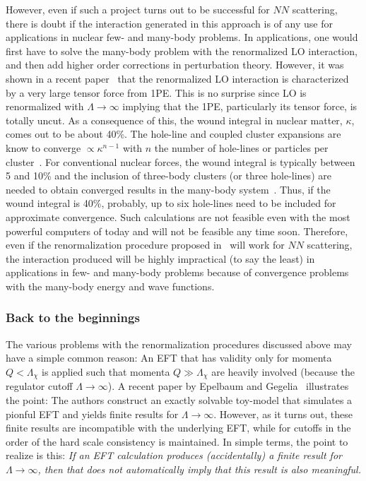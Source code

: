 \documentclass[sort&compress,preprint,3p]{elsarticle}
\begin{document}
However, even if such a project turns out to be successful for $NN$ scattering,
there is doubt if the interaction generated in this approach is of any use
for applications in nuclear few- and many-body problems.
In applications, one would first have to solve the many-body problem
with the renormalized LO interaction, and then add higher order corrections in
perturbation theory.
However, it was shown in a recent paper~\cite{Mac09} that the renormalized LO
interaction
is characterized by a very large tensor force from 1PE. This is no surprise since
LO is renormalized with $\Lambda \rightarrow \infty$ implying that the 1PE,
particularly its tensor force, is totally uncut.
As a consequence of this, the wound integral in nuclear matter, $\kappa$,
comes out to be about 40\%. The hole-line and coupled cluster expansions
are know to converge $\propto \kappa^{n-1}$
with $n$ the number of hole-lines or particles per cluster~\cite{Bra67,Day67,Bet71}.
For conventional nuclear forces, the wound integral is typically between 5 and 10\%
and the inclusion of three-body clusters (or three hole-lines) are needed to
obtain converged results in the many-body system~\cite{FOS04,Hag08,DW85}.
Thus, if the wound integral is 40\%, probably, up to six hole-lines need to be
included for approximate convergence. Such calculations are not feasible even with
the most powerful computers of today and will not be feasible any time soon.
Therefore, even if the renormalization procedure proposed in~\cite{LK08} will work
for $NN$ scattering, the interaction produced will be highly impractical (to say
the least) in applications in few- and many-body problems because of convergence problems
with the many-body energy and wave functions.

\subsubsection{Back to the beginnings}
The various problems with the renormalization procedures discussed above
may have a simple common reason:
An EFT that has validity only for momenta $Q < \Lambda_\chi$ is applied such that
momenta $Q \gg \Lambda_\chi$ are heavily involved (because the regulator cutoff
$\Lambda \rightarrow \infty$).
A recent paper by Epelbaum and Gegelia~\cite{EG09} illustrates the point:
The authors construct an exactly solvable toy-model that simulates a pionful EFT 
and yields finite results for
$\Lambda \rightarrow \infty$.  However, as it turns out, these
finite results are incompatible with the underlying EFT, while
for cutoffs in the order of the hard scale consistency is maintained.
In simple terms, the point to realize is this: 
{\it If an EFT calculation produces (accidentally) a finite result for
$\Lambda \rightarrow \infty$, then that
does not automatically imply that this result is also meaningful.}
\end{document}
